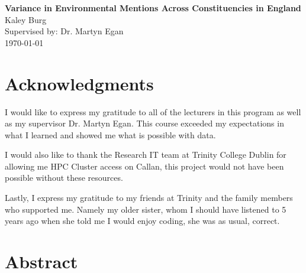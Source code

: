 \documentclass[12pt,letterpaper]{article}
\begin{document}
	
	\begin{titlepage}
		\thispagestyle{titlepageheader} %
		
		\vspace*{5cm} %
		\begin{center}
			\Large{\textbf{Variance in Environmental Mentions Across Constituencies in England}} \\ %
			\vspace{1.5cm}
			\Large{Kaley Burg} \\ %
			\vspace{0.5cm}
			\large{Supervised by: Dr. Martyn Egan} \\ %
			\vspace{1.5cm}
			\large{\today} %
		\end{center}
	\end{titlepage}
			
			\tableofcontents
			
			\newpage
			
\section*{Acknowledgments}

\noindent			
I would like to express my gratitude to all of the lecturers in this program as well as my supervisor Dr. Martyn Egan. This course exceeded my expectations in what I learned and showed me what is possible with data.
			\vspace{0.5cm}

\noindent		
I would also like to thank the Research IT team at Trinity College Dublin for allowing me HPC Cluster access on Callan, this project would not have been possible without these resources.

			\vspace{0.5cm}
\noindent
Lastly, I express my gratitude to my friends at Trinity and the family members who supported me. Namely my older sister, whom I should have listened to 5 years ago when she told me I would enjoy coding, she was as usual, correct.
			
			\newpage
	
	\section{Abstract}
	
\end{document}
